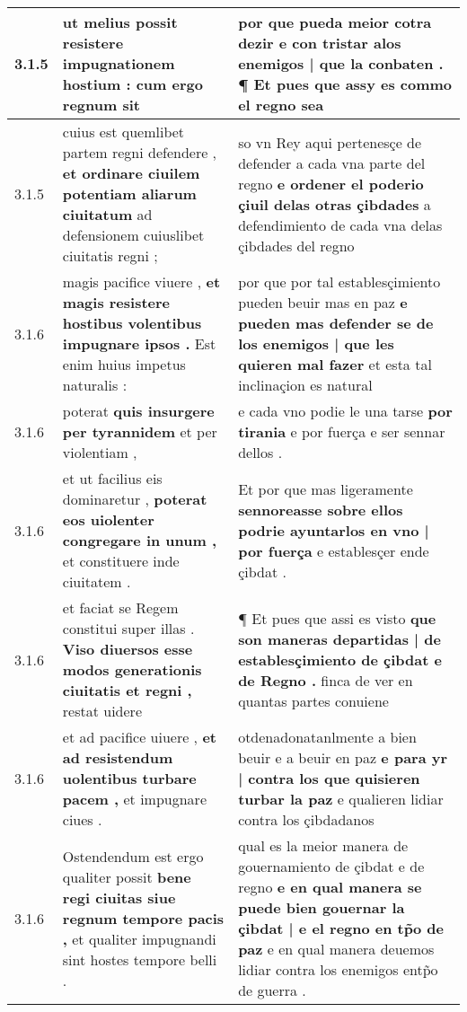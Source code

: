 \begin{tabular}{|p{1cm}|p{6.5cm}|p{6.5cm}|}
3.1.5 & ut melius possit \textbf{ resistere impugnationem hostium : } cum ergo regnum sit & por que pueda meior cotra dezir \textbf{ e con tristar alos enemigos | que la conbaten . } ¶ Et pues que assy es commo el regno sea \\\hline
3.1.5 & cuius est quemlibet partem regni defendere , \textbf{ et ordinare ciuilem potentiam aliarum ciuitatum } ad defensionem cuiuslibet ciuitatis regni ; & so vn Rey aqui pertenesçe de defender a cada vna parte del regno \textbf{ e ordener el poderio çiuil delas otras çibdades } a defendimiento de cada vna delas çibdades del regno \\\hline
3.1.6 & magis pacifice viuere , \textbf{ et magis resistere hostibus volentibus impugnare ipsos . } Est enim huius impetus naturalis : & por que por tal establesçimiento pueden beuir mas en paz \textbf{ e pueden mas defender se de los enemigos | que les quieren mal fazer } et esta tal inclinaçion es natural \\\hline
3.1.6 & poterat \textbf{ quis insurgere per tyrannidem } et per violentiam , & e cada vno podie le una tarse \textbf{ por tirania } e por fuerça e ser sennar dellos . \\\hline
3.1.6 & et ut facilius eis dominaretur , \textbf{ poterat eos uiolenter congregare in unum , } et constituere inde ciuitatem . & Et por que mas ligeramente \textbf{ sennoreasse sobre ellos podrie ayuntarlos en vno | por fuerça } e establesçer ende çibdat . \\\hline
3.1.6 & et faciat se Regem constitui super illas . \textbf{ Viso diuersos esse modos generationis ciuitatis et regni , } restat uidere & ¶ Et pues que assi es visto \textbf{ que son maneras departidas | de establesçimiento de çibdat e de Regno . } finca de ver en quantas partes conuiene \\\hline
3.1.6 & et ad pacifice uiuere , \textbf{ et ad resistendum uolentibus turbare pacem , } et impugnare ciues . & otdenadonatanlmente a bien beuir e a beuir en paz \textbf{ e para yr | contra los que quisieren turbar la paz } e qualieren lidiar contra los çibdadanos \\\hline
3.1.6 & Ostendendum est ergo qualiter possit \textbf{ bene regi ciuitas siue regnum tempore pacis , } et qualiter impugnandi sint hostes tempore belli . & qual es la meior manera de gouernamiento de çibdat e de regno \textbf{ e en qual manera se puede bien gouernar la çibdat | e el regno en tp̃o de paz } e en qual manera deuemos lidiar contra los enemigos entp̃o de guerra . \\\hline

\end{tabular}

